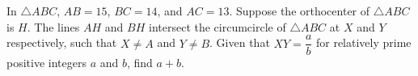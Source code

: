 In $\triangle ABC$, $AB=15$, $BC=14$, and $AC=13$. Suppose the orthocenter of $\triangle ABC$ is $H$. The lines $AH$ and $BH$ intersect the circumcircle of $\triangle ABC$ at $X$ and $Y$ respectively, such that $X\neq A$ and $Y\neq B$. Given that $XY=\dfrac{a}{b}$ for relatively prime positive integers $a$ and $b$, find $a+b$.
